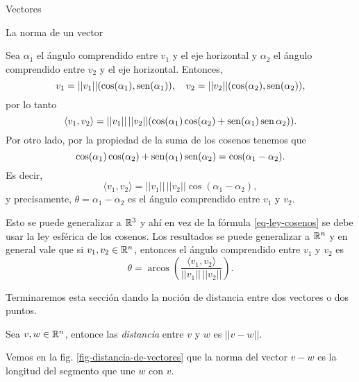 \begin{chapter}{Vectores}
\begin{section}{La norma de un vector}
        
        Sea $\alpha_1$ el ángulo comprendido  entre $v_1$ y el eje horizontal y $\alpha_2$ el ángulo comprendido  entre $v_2$ y el eje horizontal.  Entonces,
        \begin{equation*}
        v_1 = ||v_1||(\cos (\alpha_1), \operatorname{sen}(\alpha_1) ), \quad v_2 = ||v_2||(\cos (\alpha_2), \operatorname{sen}(\alpha_2) ),
        \end{equation*}
        por lo tanto
        \begin{equation*}
        \langle v_1 , v_2 \rangle =  ||v_1|| \,  ||v_2|| (\cos (\alpha_1)\cos(\alpha_2)+  \operatorname{sen}(\alpha_1)\operatorname{sen}\alpha_2)). 
        \end{equation*}
        Por otro  lado, por la propiedad de la suma de los cosenos tenemos que 
        \begin{equation}\label{eq-ley-cosenos}
        \cos (\alpha_1)\cos(\alpha_2)+  \operatorname{sen}(\alpha_1)\operatorname{sen}(\alpha_2) = \cos(\alpha_1- \alpha_2).
        \end{equation}
        Es decir, 
        \begin{equation}
        \langle v_1,v_2 \rangle =   ||v_1|| \,  ||v_2|| \cos (\alpha_1-\alpha_2), 
        \end{equation}
        y precisamente, $\theta =  \alpha_1-\alpha_2$ es el ángulo comprendido entre  $v_1$ y $v_2$.
        
        Esto se puede generalizar a $\mathbb R^3$  y ahí en vez de la fórmula \eqref{eq-ley-cosenos} se debe usar la ley esférica de los cosenos. Los resultados se puede generalizar a  $\mathbb R^n$ y  en general vale  que si $v_1, v_2 \in \mathbb R^n$,  entonces el ángulo comprendido entre $v_1$ y $v_2$ es 
        \begin{equation}\label{eq-ang-comprendido}
        \theta = 	\operatorname{arcos}\left(\frac{\langle v_1 , v_2 \rangle}{||v_1|| \,  ||v_2|| }\right).
        \end{equation}  
        
 


        Terminaremos esta sección dando la noción de  distancia entre dos vectores o dos puntos. 
        
        \begin{definicion}
            Sea $v,w \in \mathbb R^n$, entonce las \textit{distancia} entre $v$ y $w$ es $||v-w||$.
        \end{definicion}
    
    Vemos en la fig. \ref{fig-distancia-de-vectores} que la norma del vector $v-w$ es la longitud del segmento que une $w$ con $v$.


\end{section}
\end{chapter}
